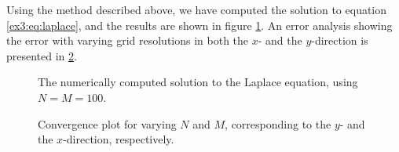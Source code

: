 Using the method described above, we have computed the solution to equation \ref{ex3:eq:laplace}, and the results are shown in figure \ref{ex3:fig:heat_map}.
An error analysis showing the error with varying grid resolutions in both the $x$- and the $y$-direction is presented in \ref{ex3:fig:convergence_plot}.

\begin{figure}[tbp]
    \centering
    \caption{The numerically computed solution to the Laplace equation, using $N = M = 100$.}
    \label{ex3:fig:heat_map}
\end{figure}

\begin{figure}[tbp]
    \centering
    
    \caption{Convergence plot for varying $N$ and $M$, corresponding to the $y$- and the $x$-direction, respectively.}
    \label{ex3:fig:convergence_plot}
\end{figure}
